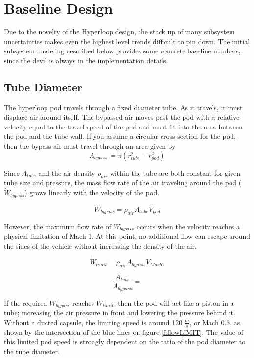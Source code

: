 \documentclass[heading.tex]{subfiles}
\begin{document}
\section{Baseline Design}

Due to the novelty of the Hyperloop design, the stack up of many subsystem uncertainties makes even the highest level trends difficult to pin down.
The initial subsystem modeling described below provides some concrete baseline numbers, since the devil is always in the implementation details. 

\subsection{Tube Diameter}
The hyperloop pod travels through a fixed diameter tube. As it travels, it must displace air around itself. The bypassed air moves past the
pod with a relative velocity equal to the travel speed of the pod and must fit into the area between the pod and the tube wall. If you
assume a circular cross section for the pod, then the bypass air must travel through an area given by
\begin{equation*}
A_{bypass} = \pi(r_{tube}^2-r_{pod}^2)
\end{equation*}

Since $A_{tube}$ and the air density $\rho_{air}$ within the tube are both constant for given tube size and pressure, the mass flow rate of the air
traveling around the pod ($\dot{W}_{bypass}$) grows linearly with the velocity of the pod.

\begin{equation*}
\dot{W}_{bypass} = \rho_{air} A_{tube} V_{pod}
\end{equation*}

However, the maximum flow rate of ${W}_{bypass}$ occurs when the velocity reaches a physical limitation of Mach 1. At this point, no additional
flow can escape around the sides of the vehicle without increasing the density of the air.

\begin{equation*}
\dot{W}_{limit} = \rho_{air} A_{bypass} V_{Mach 1}
\end{equation*}

\begin{equation*}
\frac{A_{tube}}{A_{bypass}} = 
\end{equation*}


If the required $\dot{W}_{bypass}$ reaches $\dot{W}_{limit}$, then the pod will act like a piston in a tube; increasing the air pressure in front
and lowering the pressure behind it. Without a ducted capsule, the limiting speed is around 120 $\frac{m}{s}$, or Mach 0.3, as shown by the intersection of the
blue lines on figure \ref{f:flowLIMIT}. The value of this limited pod speed is strongly dependent on the ratio of the pod diameter to the tube diameter.
\end{document}
